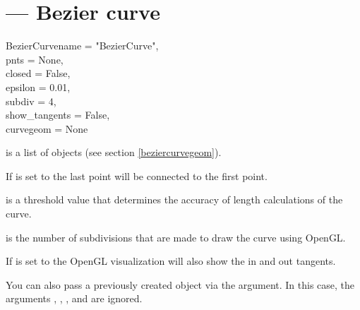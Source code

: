 
\section{ ---
         Bezier curve}

\begin{classdesc}{BezierCurve}{name = "BezierCurve",\\ 
                               pnts = None,\\
                               closed = False,\\
                               epsilon = 0.01,\\
                               subdiv = 4,\\
                               show_tangents = False,\\
                               curvegeom = None\\
                              }

 is a list of  objects (see section
\ref{beziercurvegeom}).

If  is set to  the last point will be connected
to the first point.

 is a threshold value that determines the accuracy of
length calculations of the curve.

 is the number of subdivisions that are made to draw the
curve using OpenGL.

If  is set to  the OpenGL visualization
will also show the in and out tangents.

You can also pass a previously created  object
via the  argument. In this case, the arguments ,
, ,  and  are 
ignored.
\end{classdesc}


